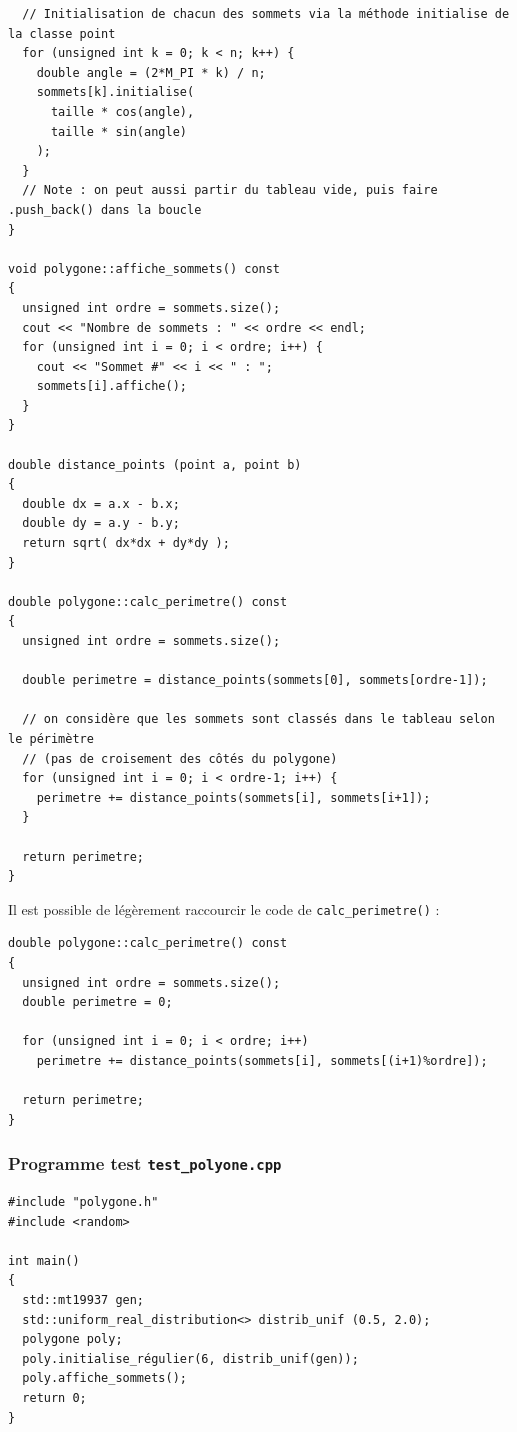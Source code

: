 \documentclass{book}
\newcommand{\inline}[1]{\texttt{#1}}
\begin{document}
\begin{correction}
\begin{verbatim}
  // Initialisation de chacun des sommets via la méthode initialise de la classe point
  for (unsigned int k = 0; k < n; k++) {
    double angle = (2*M_PI * k) / n;
    sommets[k].initialise(
      taille * cos(angle),
      taille * sin(angle)
    );
  }
  // Note : on peut aussi partir du tableau vide, puis faire .push_back() dans la boucle
}

void polygone::affiche_sommets() const
{
  unsigned int ordre = sommets.size();
  cout << "Nombre de sommets : " << ordre << endl;
  for (unsigned int i = 0; i < ordre; i++) {
    cout << "Sommet #" << i << " : ";
    sommets[i].affiche();
  }
}

double distance_points (point a, point b)
{
  double dx = a.x - b.x;
  double dy = a.y - b.y;
  return sqrt( dx*dx + dy*dy );
}

double polygone::calc_perimetre() const
{
  unsigned int ordre = sommets.size();

  double perimetre = distance_points(sommets[0], sommets[ordre-1]);

  // on considère que les sommets sont classés dans le tableau selon le périmètre
  // (pas de croisement des côtés du polygone)
  for (unsigned int i = 0; i < ordre-1; i++) {
    perimetre += distance_points(sommets[i], sommets[i+1]);
  }

  return perimetre;
}
\end{verbatim}

Il est possible de légèrement raccourcir le code de \inline{calc_perimetre()} :
\begin{verbatim}
double polygone::calc_perimetre() const
{
  unsigned int ordre = sommets.size();
  double perimetre = 0;

  for (unsigned int i = 0; i < ordre; i++)
    perimetre += distance_points(sommets[i], sommets[(i+1)%ordre]);

  return perimetre;
}
\end{verbatim}

\subsubsection*{Programme test \texttt{test\_polyone.cpp}}
\begin{verbatim}
#include "polygone.h"
#include <random>

int main()
{
  std::mt19937 gen;
  std::uniform_real_distribution<> distrib_unif (0.5, 2.0);
  polygone poly;
  poly.initialise_régulier(6, distrib_unif(gen));
  poly.affiche_sommets();
  return 0;
}
\end{verbatim}


\end{correction}
\end{document}
